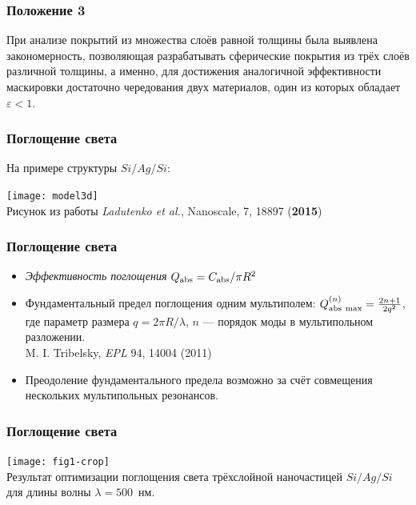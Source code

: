 \documentclass[14pt]{beamer}
\begin{document}
\begin{frame}
  \frametitle{Положение 3}
  \begin{center}     При анализе покрытий из множества слоёв равной толщины
    была выявлена закономерность, позволяющая разрабатывать
    сферические покрытия из трёх слоёв различной толщины, а именно,
    для достижения аналогичной эффективности маскировки достаточно
    чередования двух материалов, один из которых обладает
    $\varepsilon<1$. 
  \end{center}
\end{frame}

\begin{frame}
  \frametitle{Поглощение света}
  \begin{center}
На примере структуры $Si/Ag/Si$:
  \end{center}
  \begin{center}
    \texttt{[image: model3d]}    \\
  \scriptsize Рисунок из работы \textit{Ladutenko et al.}, Nanoscale, 7, 18897 (\textbf{2015})
\end{center}
\end{frame}

\begin{frame}
  \frametitle{Поглощение света}
  \small
  \begin{itemize}
  \item {\em Эффективность поглощения}
    $Q_{\rm abs}=C_{\rm abs}/\pi R^2$ 
  \item Фундаментальный предел поглощения одним мультиполем:
    $Q^{(n)}_{\rm abs\ max}=\frac{2n+1}{2q^2}$, где параметр размера
    $q=2\pi R/\lambda$, $n$ --- порядок моды в мультипольном разложении.\\
    M. I. Tribelsky, \textit{EPL} 94, 14004 (2011)

  \item Преодоление фундаментального предела возможно за счёт совмещения
    нескольких мультипольных резонансов.
  \end{itemize}

\end{frame}  

\begin{frame}
  \frametitle{Поглощение света}
  \small
  \begin{center}
    \texttt{[image: fig1-crop]}    \\
    Результат оптимизации поглощения света трёхслойной наночастицей
    $Si/Ag/Si$ для длины волны $\lambda = 500$~нм. 
  \end{center}
\end{frame}  
\end{document}
